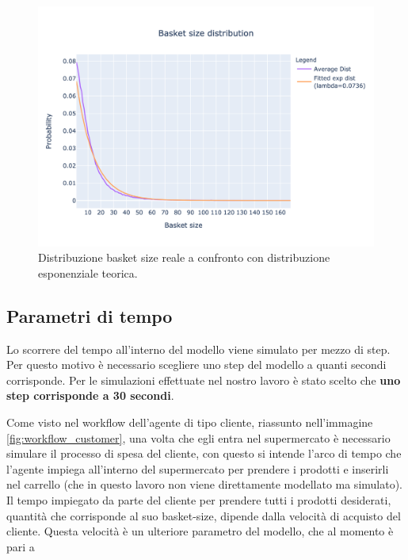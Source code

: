 \begin{figure}[H]
	\centering
 	\includegraphics[width=14cm]{"images/basket_size_fitted.png"}
	\caption{Distribuzione basket size reale a confronto con distribuzione esponenziale teorica.}
	\label{fig:dist_basket_size}
\end{figure}

\subsection{Parametri di tempo}
\label{parameters:time}
Lo scorrere del tempo all'interno del modello viene simulato per mezzo di step. Per questo motivo è necessario scegliere uno step del modello a quanti secondi corrisponde. Per le simulazioni effettuate nel nostro lavoro è stato scelto che \textbf{uno step corrisponde a 30 secondi}.

Come visto nel workflow dell'agente di tipo cliente, riassunto nell'immagine \ref{fig:workflow_customer}, una volta che egli entra nel supermercato è necessario simulare il processo di spesa del cliente, con questo si intende l'arco di tempo che l'agente impiega all'interno del supermercato per prendere i prodotti e inserirli nel carrello (che in questo lavoro non viene direttamente modellato ma simulato). Il tempo impiegato da parte del cliente per prendere tutti i prodotti desiderati, quantità che corrisponde al suo basket-size, dipende dalla velocità di acquisto del cliente. Questa velocità è un ulteriore parametro del modello, che al momento è pari a 

